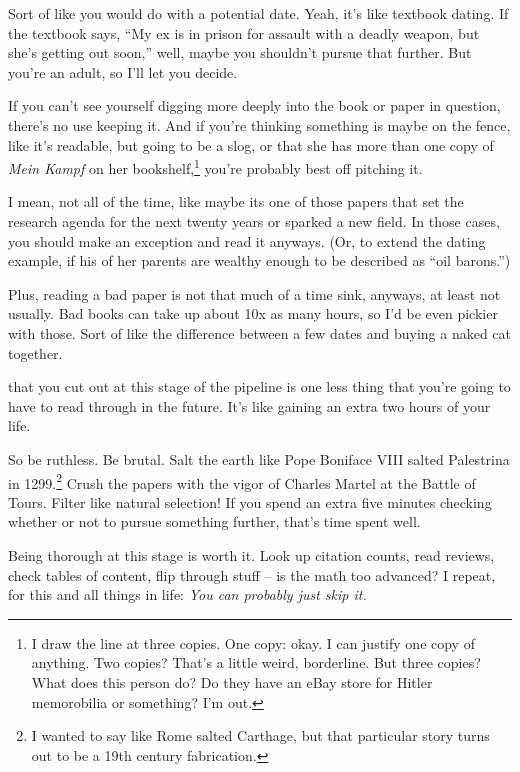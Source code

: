 Sort of like you would do with a potential date. Yeah, it's like textbook
dating. If the textbook says, ``My ex is in prison for assault with a deadly weapon, but she's getting out
soon,'' well, maybe you shouldn't pursue that further. But you're an adult, so
I'll let you decide.

If you can't see yourself digging more deeply into the book or paper in
question, there's no use keeping it. And if you're thinking something is maybe on
the fence, like it's readable, but going to be a slog, or that she has more than
one copy of \textit{Mein Kampf} on her bookshelf,\footnote{I draw the
  line at three copies. One copy: okay. I can justify one copy of anything. Two
  copies? That's a little weird, borderline. But three copies? What does
  this person do? Do they have an eBay store for Hitler memorobilia or
  something? I'm out.} you're probably best off
pitching it.

I mean, not all of the time, like maybe its one of those papers that set the research
agenda for the next twenty years or sparked a new field. In those cases, you
should make an exception and read it anyways. (Or, to extend the dating example,
if his of her parents are wealthy enough to be described as ``oil barons.'')

Plus, reading a bad paper is not that much of a time sink, anyways, at least not
usually. Bad books can take up about 10x as many hours, so I'd be even pickier
with those. Sort of like the difference between a few dates and buying a naked
cat together. 

 that you cut out at this stage of the
pipeline is one less thing that you're going to have to read through in the
future. It's like gaining an extra two hours of your life.

So be ruthless. Be brutal. Salt the earth like Pope Boniface VIII salted Palestrina in 1299.\footnote{I wanted to say like Rome salted Carthage, but that particular story turns out to be a 19th century fabrication.} Crush the papers with the vigor of Charles Martel at the Battle of Tours. Filter like natural selection! If
you spend an extra five minutes checking whether or not to pursue something
further, that's time spent well.

Being thorough at this stage is worth it. Look up citation counts, read
reviews, check tables of content, flip through stuff -- is the math too advanced?
I repeat, for this and all things in life: \textit{You can probably just skip
  it.}

